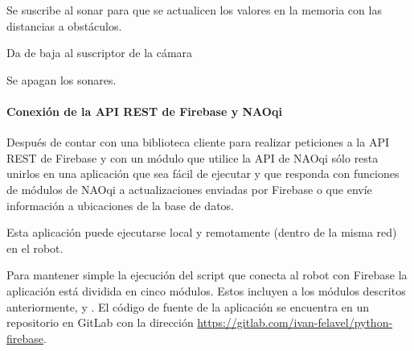 
\begin{fulllineitems}
\label{\detokenize{nao_firebase:nao_robot.Robot.subscribe_to_sonar}}
Se suscribe al sonar para que se actualicen los valores en la memoria
con las distancias a obstáculos.

\end{fulllineitems}


\begin{fulllineitems}
\label{\detokenize{nao_firebase:nao_robot.Robot.unsubscribe_to_camera}}
Da de baja al suscriptor de la cámara

\end{fulllineitems}


\begin{fulllineitems}
\label{\detokenize{nao_firebase:nao_robot.Robot.unsubscribe_to_sonar}}
Se apagan los sonares.

\end{fulllineitems}




\paragraph{Conexión de la API REST de Firebase y NAOqi}
\label{\detokenize{nao_firebase:conectando-la-api-rest-de-firebase-y-naoqi}}
Después de contar con una biblioteca cliente para realizar peticiones a la
API REST de Firebase y con un módulo que utilice la API de NAOqi sólo
resta unirlos en una aplicación que sea fácil de ejecutar y que responda con
funciones de módulos de NAOqi a actualizaciones enviadas por Firebase o
que envíe información a ubicaciones de la base de datos.

Esta aplicación puede ejecutarse local y remotamente (dentro de la misma red)
en el robot.

Para mantener simple la ejecución del script que conecta al robot con Firebase
la aplicación está dividida en cinco módulos. Estos incluyen a los módulos
descritos anteriormente,  y . El código de fuente de la aplicación 
se encuentra en un repositorio
en GitLab con la dirección
\url{https://gitlab.com/ivan-felavel/python-firebase}.


